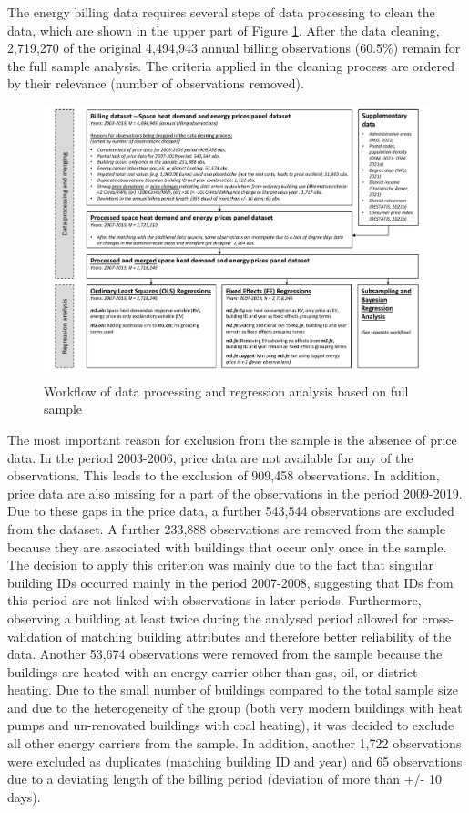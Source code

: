 \documentclass[12pt,twoside]{reedthesis}
\begin{document}
The energy billing data requires several steps of data processing to clean the data, which are shown in the upper part of Figure \ref{fig:workflow1}. After the data cleaning, 2,719,270 of the original 4,494,943 annual billing observations (60.5\%) remain for the full sample analysis. The criteria applied in the cleaning process are ordered by their relevance (number of observations removed).
\begin{figure}

{\centering \includegraphics[width=1.03\linewidth]{figure/workflow_diagramm_part1} 

}

\caption{Workflow of data processing and regression analysis based on full sample}\label{fig:workflow1}
\end{figure}
The most important reason for exclusion from the sample is the absence of price data. In the period 2003-2006, price data are not available for any of the observations. This leads to the exclusion of 909,458 observations. In addition, price data are also missing for a part of the observations in the period 2009-2019. Due to these gaps in the price data, a further 543,544 observations are excluded from the dataset. A further 233,888 observations are removed from the sample because they are associated with buildings that occur only once in the sample. The decision to apply this criterion was mainly due to the fact that singular building IDs occurred mainly in the period 2007-2008, suggesting that IDs from this period are not linked with observations in later periods. Furthermore, observing a building at least twice during the analysed period allowed for cross-validation of matching building attributes and therefore better reliability of the data. Another 53,674 observations were removed from the sample because the buildings are heated with an energy carrier other than gas, oil, or district heating. Due to the small number of buildings compared to the total sample size and due to the heterogeneity of the group (both very modern buildings with heat pumps and un-renovated buildings with coal heating), it was decided to exclude all other energy carriers from the sample. In addition, another 1,722 observations were excluded as duplicates (matching building ID and year) and 65 observations due to a deviating length of the billing period (deviation of more than +/- 10 days).
\end{document}
